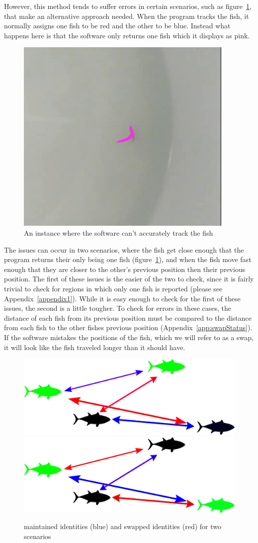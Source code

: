 \documentclass{article}
\begin{document}
However, this method tends to suffer errors in certain scenarios, such as figure~\ref{fig:overlap}, that make an alternative approach needed. When the program tracks the fish, it normally assigns one fish to be red and the other to be blue. Instead what happens here is that the software only returns one fish which it displays as pink. 

\begin{figure}[H]
	\centering
	\includegraphics[width=.5\linewidth]{videoScreenshot}
	\caption{An instance where the software can't accurately track the fish}
	\label{fig:overlap}
\end{figure}

The issues can occur in two scenarios, where the fish get close enough that the program returns their only being one fish (figure~\ref{fig:overlap}), and when the fish move fast enough that they are closer to the other's previous position then their previous position. The first of these issues is the easier of the two to check, since it is fairly trivial to check for regions in which only one fish is reported (please see Appendix~\ref{appendix1}). While it is easy enough to check for the first of these issues, the second is a little tougher. To check for errors in these cases, the distance of each fish from its previous position must be compared to the distance from each fish to the other fishes previous position (Appendix~\ref{app:swapStatus}). If the software mistakes the positions of the fish, which we will refer to as a swap, it will look like the fish traveled longer than it should have.

\begin{figure}[H]
	\centering
	\includegraphics[width=.49\linewidth]{fish3}
	\includegraphics[width=.49\linewidth]{fish4}
	\caption{maintained identities (blue) and swapped identities (red) for two scenarios}
	\label{fig:broverlap}
\end{figure}
\end{document}

